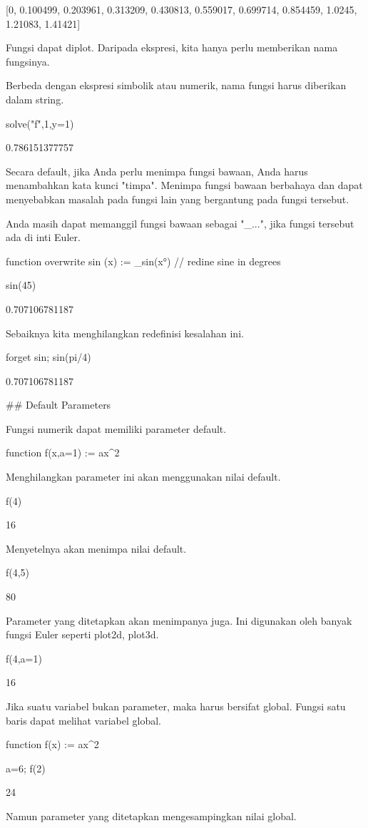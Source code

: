 \documentclass{article}
\begin{document}
    [0,  0.100499,  0.203961,  0.313209,  0.430813,  0.559017,  0.699714,
    0.854459,  1.0245,  1.21083,  1.41421]

Fungsi dapat diplot. Daripada ekspresi, kita hanya perlu memberikan
nama fungsinya.


Berbeda dengan ekspresi simbolik atau numerik, nama fungsi harus
diberikan dalam string.


\>solve("f",1,y=1)


    0.786151377757

Secara default, jika Anda perlu menimpa fungsi bawaan, Anda harus
menambahkan kata kunci "timpa". Menimpa fungsi bawaan berbahaya dan
dapat menyebabkan masalah pada fungsi lain yang bergantung pada fungsi
tersebut.


Anda masih dapat memanggil fungsi bawaan sebagai "_...", jika fungsi
tersebut ada di inti Euler.


\>function overwrite sin (x) := \_sin(x°) // redine sine in degrees

\>sin(45)


    0.707106781187

Sebaiknya kita menghilangkan redefinisi kesalahan ini.


\>forget sin; sin(pi/4)


    0.707106781187

## Default Parameters

Fungsi numerik dapat memiliki parameter default.


\>function f(x,a=1) := a\*x^2


Menghilangkan parameter ini akan menggunakan nilai default.


\>f(4)


    16

Menyetelnya akan menimpa nilai default.


\>f(4,5)


    80

Parameter yang ditetapkan akan menimpanya juga. Ini digunakan oleh
banyak fungsi Euler seperti plot2d, plot3d.


\>f(4,a=1)


    16

Jika suatu variabel bukan parameter, maka harus bersifat global.
Fungsi satu baris dapat melihat variabel global.


\>function f(x) := a\*x^2

\>a=6; f(2)


    24

Namun parameter yang ditetapkan mengesampingkan nilai global.
\end{document}
